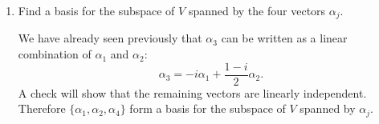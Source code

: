 \begin{enumerate}
\item Find a basis for the subspace of $V$ spanned by the four vectors
  $\alpha_j$.
  \begin{solution}
    We have already seen previously that $\alpha_3$ can be written as
    a linear combination of $\alpha_1$ and $\alpha_2$:
    \begin{equation*}
      \alpha_3 = -i\alpha_1 + \frac{1 - i}2\alpha_2.
    \end{equation*}
    A check will show that the remaining vectors are linearly
    independent. Therefore $\{\alpha_1,\alpha_2,\alpha_4\}$ form a
    basis for the subspace of $V$ spanned by $\alpha_j$.
  \end{solution}
\end{enumerate}
